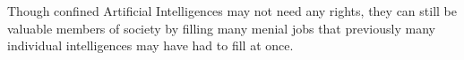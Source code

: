 Though confined Artificial Intelligences may not need any rights, they can still be valuable members of society by filling many menial jobs that previously many individual intelligences may have had to fill at once.